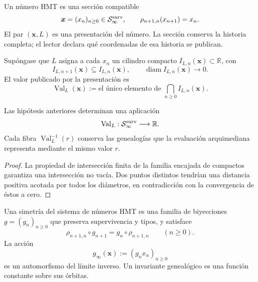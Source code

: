 \begin{definition}
\label{p3-83-c44-s2:def:numero-hmt-cierre-genealogico}
Un número HMT es una sección compatible
\[
 \boldsymbol x=(x_n)_{n\geq0}\in\mathcal S_\infty^{\rm surv},
 \qquad
 \rho_{n+1,n}(x_{n+1})=x_n.
\]
El par \((\boldsymbol x,L)\) es una presentación del número. La sección
conserva la historia completa; el lector declara qué coordenadas de esa
historia se publican.
\end{definition}

\begin{definition}
\label{p3-83-c44-s2:def:valor-arquimediano-cierre-genealogico}
Supóngase que \(L\) asigna a cada \(x_n\) un cilindro compacto
\(I_{L,n}(\boldsymbol x)\subset\mathbb R\), con
\[
 I_{L,n+1}(\boldsymbol x)\subseteq I_{L,n}(\boldsymbol x),
 \qquad
 \operatorname{diam}I_{L,n}(\boldsymbol x)\longrightarrow0.
\]
El valor publicado por la presentación es
\[
 \operatorname{Val}_L(\boldsymbol x)
 :=\text{el único elemento de }
 \bigcap_{n\geq0}I_{L,n}(\boldsymbol x).
\]
\end{definition}

\begin{proposition}
\label{p3-83-c44-s2:prop:evaluacion-seccion-genealogica}
Las hipótesis anteriores determinan una aplicación
\[
 \operatorname{Val}_L:\mathcal S_\infty^{\rm surv}\longrightarrow\mathbb R.
\]
Cada fibra \(\operatorname{Val}_L^{-1}(r)\) conserva las genealogías que la
evaluación arquimediana representa mediante el mismo valor \(r\).
\end{proposition}

\begin{proof}
La propiedad de intersección finita de la familia encajada de compactos
garantiza una intersección no vacía. Dos puntos distintos tendrían una
distancia positiva acotada por todos los diámetros, en contradicción con la
convergencia de éstos a cero.
\end{proof}

\begin{definition}
\label{p3-83-c44-s2:def:simetria-genealogica-hmt}
Una simetría del sistema de números HMT es una familia de biyecciones
\(g=(g_n)_{n\geq0}\) que preserva supervivencia y tipos, y satisface
\[
 \rho_{n+1,n}\circ g_{n+1}
 =g_n\circ\rho_{n+1,n}
 \qquad(n\geq0).
\]
La acción
\[
 g_\infty(\boldsymbol x):=(g_n x_n)_{n\geq0}
\]
es un automorfismo del límite inverso. Un invariante genealógico es una
función constante sobre sus órbitas.
\end{definition}

